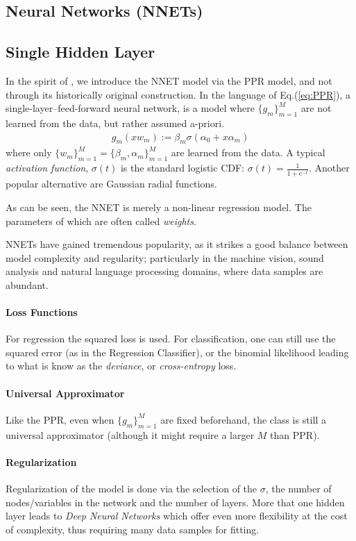 \documentclass[12pt,a4paper]{article}
\theoremstyle{plain}
\theoremstyle{definition}
\begin{document}
\subsection{Neural Networks (NNETs)}
\subsection{Single Hidden Layer}
In the spirit of \cite[Section 11]{hastie_elements_2003}, we introduce the NNET model via the PPR model, and not through its historically original construction.
In the language of Eq.(\ref{eq:PPR}), a single-layer--feed-forward neural network, is a model where $\{g_m\}_{m=1}^M$  are not learned from the data, but rather assumed a-priori. 
\begin{align*}
	g_m(x w_m):= \beta_m \sigma(\alpha_0 + x \alpha_m )
\end{align*}
where only $\{w_m\}_{m=1}^M = \{\beta_m, \alpha_m\}_{m=1}^M$ are learned from the data. 
A typical \emph{activation function}, $\sigma(t)$ is the standard logistic CDF: $\sigma(t)=\frac{1}{1+e^{-t}}$. Another popular alternative are Gaussian radial functions.

As can be seen, the NNET is merely a non-linear regression model.
The parameters of which are often called \emph{weights}.

NNETs have gained tremendous popularity, as it strikes a good balance between model complexity and regularity; particularly in the machine vision, sound analysis and natural language processing domains, where data samples are abundant.

\paragraph{Loss Functions}
For regression the squared loss is used. For classification, one can still use the squared error (as in the Regression Classifier), or the binomial likelihood leading to what is know as the \emph{deviance}, or \emph{cross-entropy} loss.

\paragraph{Universal Approximator}
Like the PPR, even when $\{g_m\}_{m=1}^M$ are fixed beforehand, the class is still a universal approximator (although it might require a larger $M$ than PPR).

\paragraph{Regularization}
Regularization of the model is done via the selection of the $\sigma$, the number of nodes/variables in the network and the number of layers. More that one hidden layer leads to \emph{Deep Neural Networks} which offer even more flexibility at the cost of complexity, thus requiring many data samples for fitting.
\end{document}
